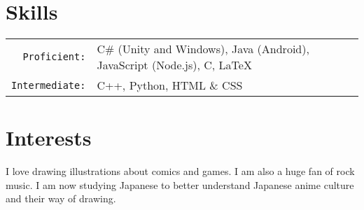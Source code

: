 \documentclass[12pt, letterpaper]{article}
\begin{document}
\bigskip

\section{Skills}
\smallskip
\noindent
\begin{tabularx}{\linewidth}{r X}
	\texttt{Proficient:} & C\# (Unity and Windows), Java (Android), JavaScript (Node.js), C, \LaTeX \\
	\texttt{Intermediate:} & C++, Python, HTML \& CSS
\end{tabularx}

\bigskip
\section{Interests}
\smallskip
\noindent
I love drawing illustrations about comics and games. I am also a huge fan of rock music. I am now studying Japanese to better understand Japanese anime culture and their way of drawing.
\end{document}

